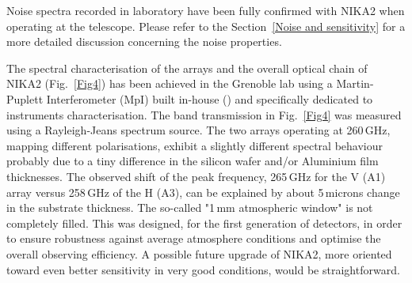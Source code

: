 \documentclass[]{aa} %
\begin{document}
Noise spectra recorded in laboratory have been fully confirmed with NIKA2 when operating at the telescope. Please refer to the Section~\ref{Noise and sensitivity} for a more detailed discussion concerning the noise properties. 

The spectral characterisation of the arrays and the overall optical chain of NIKA2 (Fig.~\ref{Fig4}) has been achieved in the Grenoble lab using a Martin-Puplett Interferometer (MpI) built in-house (\cite{Durand2008}) and specifically dedicated to instruments characterisation.
The band transmission in Fig.~\ref{Fig4} was measured using a Rayleigh-Jeans spectrum source.
The two arrays operating at 260\,GHz, mapping different polarisations, exhibit a slightly different spectral behaviour probably due to a tiny difference in the silicon wafer and/or Aluminium film thicknesses. The observed shift of the peak frequency, 265\,GHz for the V (A1) array versus 258\,GHz of the H (A3), can be explained by about 5\,microns change in the substrate thickness. The so-called "1\,mm atmospheric window" is not completely filled. This was designed, for the first generation of detectors, in order to ensure robustness against average atmosphere conditions and optimise the overall observing efficiency. A possible future upgrade of NIKA2, more oriented toward even better sensitivity in very good conditions, would be straightforward. 
\end{document}
